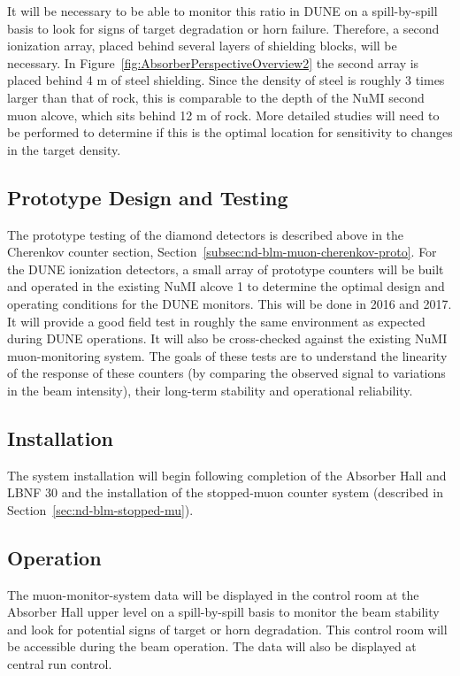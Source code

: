 It will be necessary to be able to monitor this ratio in DUNE on a spill-by-spill basis to look for signs of target degradation or horn failure.  
Therefore, a second ionization array, placed behind several layers of 
shielding blocks, will be necessary.  In Figure~\ref{fig:AbsorberPerspectiveOverview2}
the second array is placed behind 4 m of steel shielding.  Since the density of steel is roughly 3 times larger than that of rock, this is comparable to the depth of the NuMI second muon alcove, which sits behind 12 m of rock.  More detailed studies will need to be performed to determine if this is the optimal location for sensitivity to changes in the target density.


\subsection{Prototype Design and Testing}

The prototype testing of the diamond detectors is described above in the 
Cherenkov counter section, Section~\ref{subsec:nd-blm-muon-cherenkov-proto}.
For the DUNE ionization detectors, a small array of prototype
counters will be built and operated in the existing NuMI
alcove 1 to determine the optimal design and operating conditions for
the DUNE monitors. This will be done in 2016 and 2017. 
It will provide a good field test in roughly the same environment as expected during DUNE
operations. It will also be cross-checked against the existing NuMI
muon-monitoring system.  The goals of these tests are to understand the linearity of the response of these counters (by comparing the observed signal to variations in the beam intensity), their long-term stability and operational reliability.  

\subsection{Installation}

The system installation will begin following completion of the
Absorber Hall and LBNF 30 and the installation of the stopped-muon counter system
(described in Section~\ref{sec:nd-blm-stopped-mu}).

\subsection{Operation}

The muon-monitor-system data will be displayed in the control room 
at the Absorber Hall upper level on
a spill-by-spill basis to monitor the beam stability and look for potential signs of target or horn degradation. 
This control room will be accessible during the beam operation.
The data will also be displayed at central run control.  

